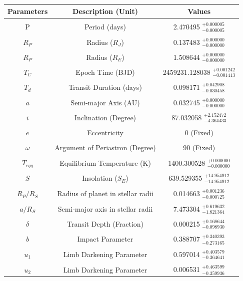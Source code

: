 \documentclass[12pt, a4paper]{book}
\begin{document}
\begin{center}
\begin{tabular}{c c c}
\hline
\hline
Parameters & Description (Unit) & Values \\
\hline
 & & \\
P & Period (days) & 2.470495 $^{+ 0.000005 } _{- 0.000005 }$ \\
 & & \\
$R_P$ & Radius ($R_J$) & 0.137483 $^{+ 0.000000 } _{- 0.000000 }$ \\
 & & \\
$R_P$ & Radius ($R_E$) & 1.508644 $^{+ 0.000000 } _{- 0.000000 }$ \\
 & & \\
$T_C$ & Epoch Time (BJD) & 2459231.128038 $^{+ 0.001242 } _{- 0.001413 }$ \\
 & & \\
$T_d$ & Transit Duration (days) & 0.098171 $^{+ 0.042908 } _{- 0.030458 }$ \\
 & & \\
$a$ & Semi-major Axis (AU) & 0.032745 $^{+ 0.000000 } _{- 0.000000 }$ \\
 & & \\
$i$ & Inclination (Degree) & 87.032058 $^{+ 2.152472 } _{- 4.364433 }$ \\
 & & \\
$e$ & Eccentricity & 0 (Fixed) \\
 & & \\
$\omega$ & Argument of Periastron (Degree) & 90 (Fixed) \\
 & & \\
$T_{eqq}$ & Equilibrium Temperature (K) & 1400.300528 $^{+ 0.000000 } _{- 0.000000 }$ \\
 & & \\
$S$ & Insolation ($S_E$) & 639.529355 $^{+ 14.954912 } _{- 14.954912 }$ \\
 & & \\
$R_P/R_S$ & Radius of planet in stellar radii & 0.014663 $^{+ 0.001236 } _{- 0.000725 }$ \\
 & & \\
$a/R_S$ & Semi-major axis in stellar radii & 7.473304 $^{+ 0.619632 } _{- 1.821364 }$ \\
 & & \\
$\delta$ & Transit Depth (Fraction) & 0.000215 $^{+ 0.168644 } _{- 0.098930 }$ \\
 & & \\
$b$ & Impact Parameter & 0.388707 $^{+ 0.340393 } _{- 0.273165 }$ \\
 & & \\
$u_1$ & Limb Darkening Parameter & 0.597014 $^{+ 0.403579 } _{- 0.364641 }$ \\
 & & \\
$u_2$ & Limb Darkening Parameter & 0.006531 $^{+ 0.463599 } _{- 0.359936 }$ \\
\end{tabular}
\end{center}
 
\end{document}
